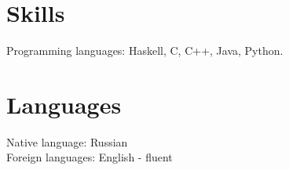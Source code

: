 \section*{Skills}

Programming languages: Haskell, C, C++, Java, Python.

\section*{Languages}
Native language: Russian\\
Foreign languages: English - fluent
